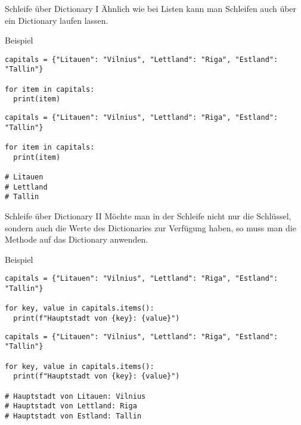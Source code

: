 \begin{fragile}
\begin{block}{Schleife über Dictionary I}
\vspace{2pt}
Ähnlich wie bei Listen kann man Schleifen auch über ein Dictionary laufen lassen.  
\end{block}
\vspace{12pt}
\pause 

\begin{exampleblock}{Beispiel}
\vspace{2pt}
\begin{overprint}
\begin{verbatim}
capitals = {"Litauen": "Vilnius", "Lettland": "Riga", "Estland": "Tallin"}

for item in capitals:
  print(item)
\end{verbatim}
\begin{verbatim}
capitals = {"Litauen": "Vilnius", "Lettland": "Riga", "Estland": "Tallin"}

for item in capitals:
  print(item)

# Litauen
# Lettland
# Tallin
\end{verbatim}
\end{overprint}
\end{exampleblock}
\end{fragile}

\begin{fragile}
\begin{block}{Schleife über Dictionary II}
\vspace{2pt}
Möchte man in der Schleife nicht nur die Schlüssel, sondern auch die Werte des Dictionaries zur Verfügung haben, so muss man die Methode  auf das Dictionary anwenden.   
\end{block}
\vspace{12pt}
\pause 


\begin{exampleblock}{Beispiel}
\vspace{2pt}
\begin{overprint}
\begin{verbatim}
capitals = {"Litauen": "Vilnius", "Lettland": "Riga", "Estland": "Tallin"}

for key, value in capitals.items():
  print(f"Hauptstadt von {key}: {value}")
\end{verbatim}
\begin{verbatim}
capitals = {"Litauen": "Vilnius", "Lettland": "Riga", "Estland": "Tallin"}

for key, value in capitals.items():
  print(f"Hauptstadt von {key}: {value}")

# Hauptstadt von Litauen: Vilnius
# Hauptstadt von Lettland: Riga
# Hauptstadt von Estland: Tallin
\end{verbatim}
\end{overprint}
\end{exampleblock}
\end{fragile}


